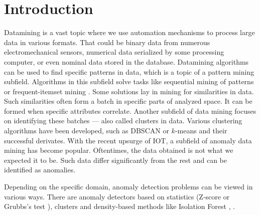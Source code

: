 \section{Introduction}
\label{sec:introduction}





Datamining is a vast topic where we use automation mechanisms to process large data in various formats. That could be binary data from numerous electromechanical sensors, numerical data serialized by some processing computer, or even nominal data stored in the database.
Datamining algorithms can be used to find specific patterns in data, which is a topic of a pattern mining subfield. Algorithms in this subfield solve tasks like sequential mining of patterns \cite{agrawal1995mining} or frequent-itemset mining \cite{agrawal1994fast}. 
Some solutions lay in mining for similarities in data. Such similarities often form a batch in specific parts of analyzed space. It can be formed when specific attributes correlate. Another subfield of data mining focuses on identifying these batches --- also called clusters in data. Various clustering algorithms have been developed, such as DBSCAN \cite{Ester1996dbscan} or \(k\)-means \cite{lloyd1982kmeans} and their successful derivates.
With the recent upsurge of IOT, a subfield of anomaly data mining has become popular. Oftentimes, the data obtained is not what we expected it to be. Such data differ significantly from the rest and can be identified as anomalies.



Depending on the specific domain, anomaly detection problems can be viewed in various ways. There are anomaly detectors based on statistics (Z-score or Grubbs's test \cite{grubbs1949sample}), clusters \cite{he2003discovering} and density-based methods like Isolation Forest \cite{liu2008isolation}, \cite{liu2012isolation}.


